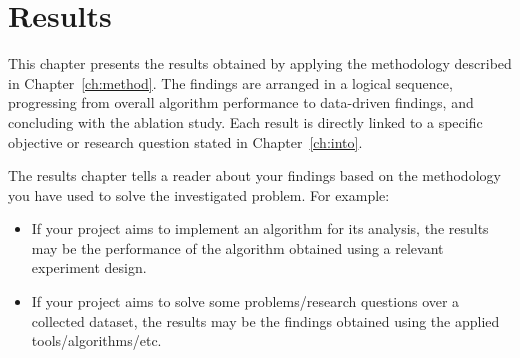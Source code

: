 
\chapter{Results}
\label{ch:results}

This chapter presents the results obtained by applying the methodology described 
in Chapter~\ref{ch:method}. The findings are arranged in a logical sequence, 
progressing from overall algorithm performance to data-driven findings, and 
concluding with the ablation study. Each result is directly linked to a specific 
objective or research question stated in Chapter~\ref{ch:into}.

\noindent The results chapter tells a reader about your findings based on the 
methodology you have used to solve the investigated problem. For example:
\begin{itemize}
    \item If your project aims to implement an algorithm for its analysis, the
    results may be the performance of the algorithm obtained using a relevant
    experiment design.

    \item If your project aims to solve some problems/research questions over a
    collected dataset, the results may be the findings obtained using the applied
    tools/algorithms/etc.
\end{itemize}

